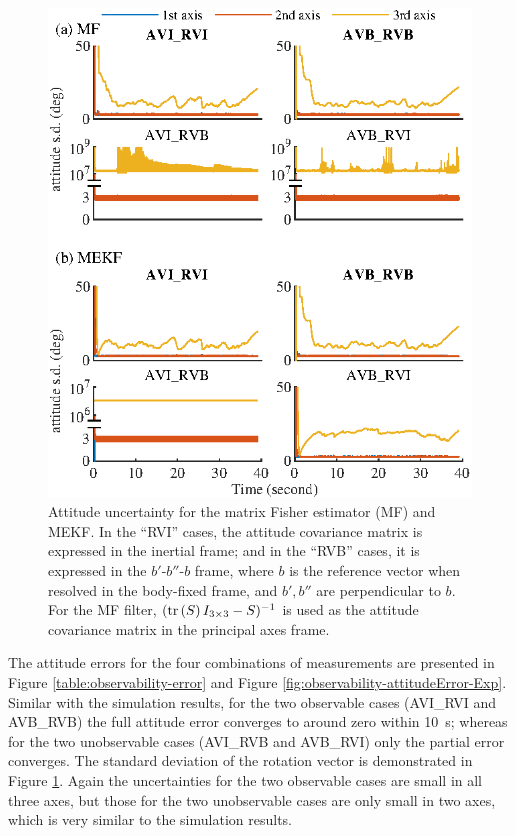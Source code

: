 \begin{figure}
	\centering
	\includegraphics[scale=1.4]{figures/observability/attitudeStd-Exp}
	\caption{Attitude uncertainty for the matrix Fisher estimator (MF) and MEKF.
		In the ``RVI'' cases, the attitude covariance matrix is expressed in the inertial frame; and in the ``RVB'' cases, it is expressed in the $b'$-$b''$-$b$ frame, where $b$ is the reference vector when resolved in the body-fixed frame, and $b',b''$ are perpendicular to $b$.
		For the MF filter, $(\mathrm{tr}\left( S \right)I_{3\times 3}-S)^{-1}$ is used as the attitude covariance matrix in the principal axes frame. \label{fig:observability-attitudeStd-Exp}}
\end{figure}

The attitude errors for the four combinations of measurements are presented in Figure \ref{table:observability-error} and Figure \ref{fig:observability-attitudeError-Exp}.
Similar with the simulation results, for the two observable cases (AVI\_RVI and AVB\_RVB) the full attitude error converges to around zero within \SI{10}{\second}; whereas for the two unobservable cases (AVI\_RVB and AVB\_RVI) only the partial error converges.
The standard deviation of the rotation vector is demonstrated in Figure \ref{fig:observability-attitudeStd-Exp}.
Again the uncertainties for the two observable cases are small in all three axes, but those for the two unobservable cases are only small in two axes, which is very similar to the simulation results.

